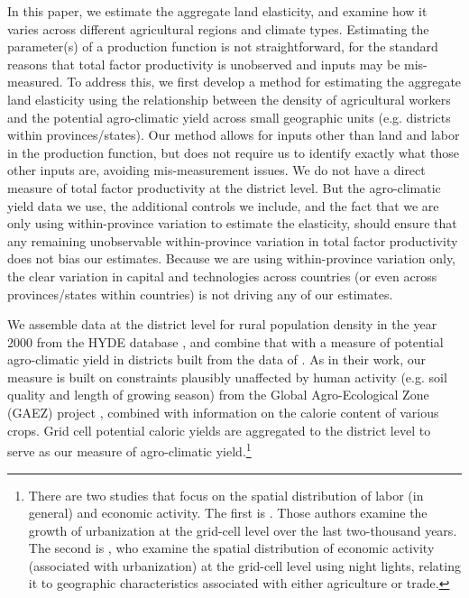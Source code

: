 \documentclass[11pt]{article}
\begin{document}
In this paper, we estimate the aggregate land elasticity, and examine how it varies across different agricultural regions and climate types. Estimating the parameter(s) of a production function is not straightforward, for the standard reasons that total factor productivity is unobserved and inputs may be mis-measured. To address this, we first develop a method for estimating the aggregate land elasticity using the relationship between the density of agricultural workers and the potential agro-climatic yield across small geographic units (e.g. districts within provinces/states). Our method allows for inputs other than land and labor in the production function, but does not require us to identify exactly what those other inputs are, avoiding mis-measurement issues. We do not have a direct measure of total factor productivity at the district level. But the agro-climatic yield data we use, the additional controls we include, and the fact that we are only using within-province variation to estimate the elasticity, should ensure that any remaining unobservable within-province variation in total factor productivity does not bias our estimates. Because we are using within-province variation only, the clear variation in capital and technologies across countries (or even across provinces/states within countries) is not driving any of our estimates.

We assemble data at the district level for rural population density in the year 2000 from the HYDE database \citep{hyde31}, and combine that with a measure of potential agro-climatic yield in districts built from the data of \citet{galorozak2016}. As in their work, our measure is built on constraints plausibly unaffected by human activity (e.g. soil quality and length of growing season) from the Global Agro-Ecological Zone (GAEZ) project \citep{gaez}, combined with information on the calorie content of various crops. Grid cell potential caloric yields are aggregated to the district level to serve as our measure of agro-climatic yield.\footnote{There are two studies that focus on the spatial distribution of labor (in general) and economic activity. The first is \citet{mfm2014}. Those authors examine the growth of urbanization at the grid-cell level over the last two-thousand years. The second is \citet{hssw2016}, who examine the spatial distribution of economic activity (associated with urbanization) at the grid-cell level using night lights, relating it to geographic characteristics associated with either agriculture or trade.}
\end{document}
